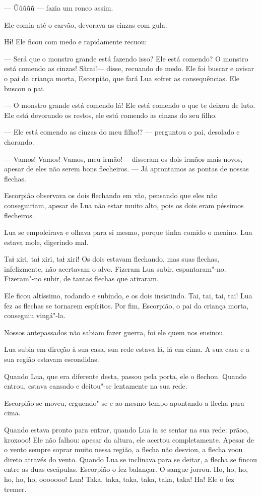 --- Ũũũũũ --- fazia um ronco assim. 

Ele comia até o carvão, devorava as cinzas com gula. 

Hɨ! Ele ficou com medo e rapidamente recuou: 

--- Será que o monstro grande está fazendo isso? Ele está comendo? O
monstro está comendo as cinzas! Sãrai!--- disse, recuando de
medo. Ele foi buscar e avisar o pai da criança morta, Escorpião, que
fará Lua sofrer as consequências. Ele buscou o pai. 

--- O monstro grande está comendo lá! Ele está comendo o que te deixou de
luto. Ele está devorando os restos, ele está comendo as cinzas
do seu filho. 

--- Ele está comendo as cinzas do meu filho!? --- perguntou o pai, desolado e
chorando. 

--- Vamos! Vamos! Vamos, meu irmão!--- disseram os dois irmãos mais
novos, apesar de eles não serem bons flecheiros. --- Já aprontamos as pontas de nossas flechas. 

Escorpião observava os dois flechando em vão, pensando que eles não
conseguiriam, apesar de Lua não estar muito alto, pois os dois eram
péssimos flecheiros. 

Lua se empoleirava e olhava para si mesmo, porque tinha comido o
menino. Lua estava mole, digerindo mal. 

Taɨ xiri, taɨ xiri, taɨ xiri! Os dois estavam flechando, mas suas
flechas, infelizmente, não acertavam o alvo. Fizeram Lua subir,
espantaram"-no. Fizeram"-no subir, de tantas flechas que atiraram. 

Ele ficou altíssimo, rodando e subindo, e os dois insistindo. Tai,
tai, tai, tai! Lua fez as flechas se tornarem espíritos. Por fim,
Escorpião, o pai da criança morta, conseguiu vingá"-la. 

Nossos antepassados não sabiam fazer guerra, foi ele quem nos ensinou. 

Lua subia em direção à sua casa, sua rede estava lá, lá em cima. A sua
casa e a sua região estavam escondidas. 

Quando Lua, que era diferente desta, passou pela porta, ele o flechou.
Quando entrou, estava cansado e deitou"-se lentamente na sua rede. 

Escorpião se moveu, erguendo"-se e ao mesmo tempo apontando a flecha
para cima. 

Quando estava pronto para entrar, quando Lua ia se sentar na sua
rede: prãoo, kroxooo! Ele não falhou: apesar da altura, ele
acertou completamente. Apesar de o vento sempre soprar muito nessa região,
a flecha não desviou, a flecha voou direto através do vento. Quando Lua se inclinava para se deitar, a flecha se fincou entre as duas
escápulas. Escorpião o fez balançar. O sangue jorrou. Ho, ho, ho,
ho, ho, ho, ooooooo! Lua! Taka, taka, taka, taka, taka,
taka! Ha! Ele o fez tremer. 

